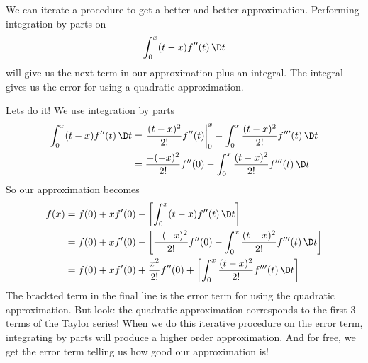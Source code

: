 We can iterate a procedure to get a better and better
approximation. Performing integration by parts on
\begin{equation}
\int^{x}_{0}(t-x)f''(t)\,\D t
\end{equation}
will give us the next term in our approximation plus an
integral. The integral gives us the error for using a quadratic
approximation. 

Lets do it! We use integration by parts 
\begin{equation}
\begin{aligned}
\int^{x}_{0}(t-x)f''(t)\,\D t &=
\left.\frac{(t-x)^{2}}{2!}f''(t)\right|^{x}_{0}-\int^{x}_{0}\frac{(t-x)^{2}}{2!}f'''(t)\,\D t\\
&=\frac{-(-x)^{2}}{2!}f''(0)-\int^{x}_{0}\frac{(t-x)^{2}}{2!}f'''(t)\,\D t
\end{aligned}
\end{equation}
So our approximation becomes
\begin{equation}
\begin{aligned}
f(x) &= f(0) +  xf'(0) - \left[\int^{x}_{0}(t-x)f''(t)\,\D  t\right]\\
&=f(0) + xf'(0) - \left[\frac{-(-x)^{2}}{2!}f''(0)-\int^{x}_{0}\frac{(t-x)^{2}}{2!}f'''(t)\,\D t\right]\\
&=f(0) + xf'(0) + \frac{x^{2}}{2!}f''(0)+\left[\int^{x}_{0}\frac{(t-x)^{2}}{2!}f'''(t)\,\D t\right]
\end{aligned}
\end{equation}
The brackted term in the final line is the error term for using
the quadratic approximation. But look: the quadratic
approximation corresponds to the first 3 terms of the Taylor series!
When we do this iterative procedure on the error term,
integrating by parts will produce a higher order
approximation. And for free, we get the error term telling us how
good our approximation is!
